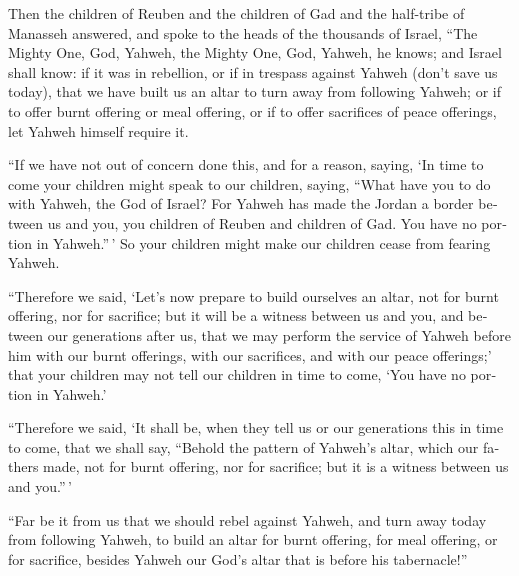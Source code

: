 \begin{paracol}{2}
\begin{otherlanguage}{english}
 Then the children of Reuben and the children of Gad and
the half-tribe of Manasseh answered, and spoke to the heads of the
thousands of Israel,  ``The Mighty One, God, Yahweh, the
Mighty One, God, Yahweh, he knows; and Israel shall know: if it was in
rebellion, or if in trespass against Yahweh (don't save us today),
 that we have built us an altar to turn away from
following Yahweh; or if to offer burnt offering or meal offering, or if
to offer sacrifices of peace offerings, let Yahweh himself require it.

 ``If we have not out of concern done this, and for a
reason, saying, `In time to come your children might speak to our
children, saying, ``What have you to do with Yahweh, the God of Israel?
 For Yahweh has made the Jordan a border between us and
you, you children of Reuben and children of Gad. You have no portion in
Yahweh.''\,' So your children might make our children cease from fearing
Yahweh.

 ``Therefore we said, `Let's now prepare to build
ourselves an altar, not for burnt offering, nor for sacrifice;
 but it will be a witness between us and you, and between
our generations after us, that we may perform the service of Yahweh
before him with our burnt offerings, with our sacrifices, and with our
peace offerings;' that your children may not tell our children in time
to come, `You have no portion in Yahweh.'

 ``Therefore we said, `It shall be, when they tell us or
our generations this in time to come, that we shall say, ``Behold the
pattern of Yahweh's altar, which our fathers made, not for burnt
offering, nor for sacrifice; but it is a witness between us and
you.''\,'

 ``Far be it from us that we should rebel against Yahweh,
and turn away today from following Yahweh, to build an altar for burnt
offering, for meal offering, or for sacrifice, besides Yahweh our God's
altar that is before his tabernacle!''


\end{otherlanguage}
\end{paracol}

